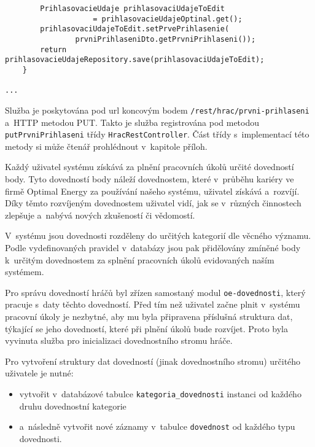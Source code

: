 \documentclass[12pt]{article}
\begin{document}
{\begin{lstlisting}
        PrihlasovacieUdaje prihlasovaciUdajeToEdit 
                    = prihlasovacieUdajeOptinal.get();
        prihlasovaciUdajeToEdit.setPrvePrihlasenie(
                prvniPrihlaseniDto.getPrvniPrihlaseni());
        return prihlasovacieUdajeRepository.save(prihlasovaciUdajeToEdit);
    }

...
\end{lstlisting}

Služba je poskytována pod url koncovým bodem \texttt{/rest/hrac/prvni-prihlaseni} a~HTTP metodou PUT.
Takto je služba registrována pod metodou \texttt{putPrvniPrihlaseni} třídy \texttt{HracRestController}.
Část třídy s~implementací této metody si může čtenář prohlédnout v~kapitole příloh.

\clearpage


Každý uživatel systému získává za plnění pracovních úkolů určité dovedností body.
Tyto dovedností body náleží dovednostem, které v~průběhu kariéry ve firmě Optimal Energy za používání našeho systému,
uživatel získává a~rozvíjí.
Díky těmto rozvíjeným dovednostem uživatel vidí,
jak se v~různých činnostech zlepšuje a~nabývá nových zkušeností či vědomostí.

V~systému jsou dovednosti rozděleny do určitých kategorií dle věcného významu.
Podle vydefinovaných pravidel v~databázy jsou pak přidělovány
zmíněné body k~určitým dovednostem za splnění pracovních úkolů evidovaných naším systémem.

Pro správu dovedností hráčů byl zřízen samostaný modul \texttt{oe-dovednosti},
který pracuje s~daty těchto dovedností.
Před tím než uživatel začne plnit v~systému pracovní úkoly je nezbytné,
aby mu byla připravena příslušná struktura dat, týkající se jeho dovedností,
které při plnění úkolů bude rozvíjet.
Proto byla vyvinuta služba pro inicializaci dovednostního stromu hráče.

Pro vytvoření struktury dat dovedností (jinak dovednostního stromu) určitého uživatele je nutné:

\begin{itemize}

\item vytvořit v~databázové tabulce \texttt{kategoria\_dovednosti} instanci od každého druhu dovednostní kategorie
\item  a~následně vytvořit nové záznamy v~tabulce \texttt{dovednost} od každého typu dovednosti.
\end{itemize}

}
\end{document}
